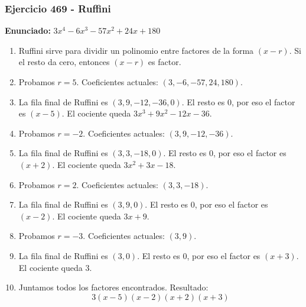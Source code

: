 \documentclass[11pt,a4paper]{article}
\begin{document}
\subsubsection*{Ejercicio 469 - Ruffini}
\textbf{Enunciado:} $ 3 x^{4} - 6 x^{3} - 57 x^{2} + 24 x + 180 $\par
\begin{enumerate}[leftmargin=2em]
\item Ruffini sirve para dividir un polinomio entre factores de la forma \((x-r)\). Si el resto da cero, entonces \((x-r)\) es factor.
\item Probamos \(r=5\). Coeficientes actuales: \((3, -6, -57, 24, 180)\).
\item La fila final de Ruffini es \((3, 9, -12, -36, 0)\). El resto es \(0\), por eso el factor es \((x-5)\). El cociente queda \(3 x^{3} + 9 x^{2} - 12 x - 36\).
\item Probamos \(r=-2\). Coeficientes actuales: \((3, 9, -12, -36)\).
\item La fila final de Ruffini es \((3, 3, -18, 0)\). El resto es \(0\), por eso el factor es \((x+2)\). El cociente queda \(3 x^{2} + 3 x - 18\).
\item Probamos \(r=2\). Coeficientes actuales: \((3, 3, -18)\).
\item La fila final de Ruffini es \((3, 9, 0)\). El resto es \(0\), por eso el factor es \((x-2)\). El cociente queda \(3 x + 9\).
\item Probamos \(r=-3\). Coeficientes actuales: \((3, 9)\).
\item La fila final de Ruffini es \((3, 0)\). El resto es \(0\), por eso el factor es \((x+3)\). El cociente queda \(3\).
\item Juntamos todos los factores encontrados. Resultado: \[\boxed{3 \left(x - 5\right) \left(x - 2\right) \left(x + 2\right) \left(x + 3\right)}\]
\end{enumerate}

\vspace{0.2cm}
\end{document}

